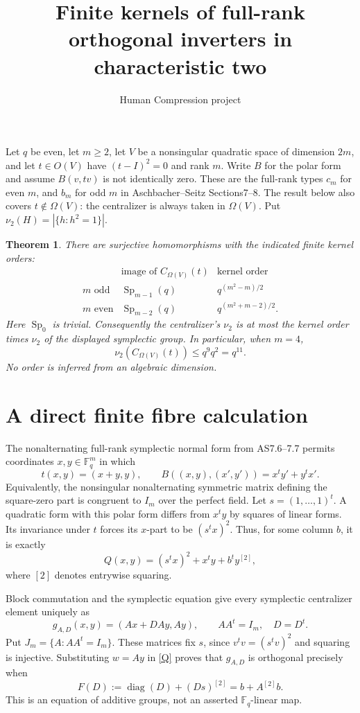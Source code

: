 \documentclass[11pt]{article}
\title{Finite kernels of full-rank orthogonal inverters in characteristic two}
\author{Human Compression project}\date{}
\newtheorem{theorem}{Theorem}\newtheorem{lemma}[theorem]{Lemma}
\newcommand{\F}{\mathbb F}\newcommand{\Sp}{\operatorname{Sp}}\newcommand{\diag}{\operatorname{diag}}\newcommand{\Tr}{\operatorname{Tr}}\newcommand{\Om}{\Omega}
\begin{document}
\maketitle
Let $q$ be even, let $m\ge2$, let $V$ be a nonsingular quadratic space
of dimension $2m$, and let $t\in O(V)$ have $(t-I)^2=0$ and rank $m$.
Write $B$ for the polar form and assume $B(v,tv)$ is not identically zero.
These are the full-rank types $c_m$ for even $m$, and $b_m$ for odd $m$
in Aschbacher--Seitz Sections7--8. The result below also covers $t\notin\Om(V)$:
the centralizer is always taken in $\Om(V)$. Put $\nu_2(H)=|\{h:h^2=1\}|$.

\begin{theorem}\label{main}
There are surjective homomorphisms with the indicated finite kernel orders:
\[
\begin{array}{c|c|c}
 &\text{image of }C_{\Om(V)}(t)&\text{kernel order}\\\hline
m\text{ odd}&\Sp_{m-1}(q)&q^{(m^2-m)/2}\\
m\text{ even}&\Sp_{m-2}(q)&q^{(m^2+m-2)/2}.
\end{array}
\]
Here $\Sp_0$ is trivial. Consequently the centralizer's $\nu_2$ is at most
the kernel order times $\nu_2$ of the displayed symplectic group.
In particular, when $m=4$,
\[
                  \nu_2(C_{\Om(V)}(t))\le q^9q^2=q^{11}.
\]
No order is inferred from an algebraic dimension.
\end{theorem}

\section{A direct finite fibre calculation}
The nonalternating full-rank symplectic normal form from AS7.6--7.7
permits coordinates $x,y\in\F_q^m$ in which
\[
 t(x,y)=(x+y,y),\qquad
 B((x,y),(x',y'))=x^ty'+y^tx'.
\]
Equivalently, the nonsingular nonalternating symmetric matrix defining
the square-zero part is congruent to $I_m$ over the perfect field.
Let $s=(1,\ldots,1)^t$. A quadratic form with this polar form differs
from $x^ty$ by squares of linear forms. Its invariance under $t$ forces
its $x$-part to be $(s^tx)^2$. Thus, for some column $b$, it is exactly
\begin{equation}\label{Q}
 Q(x,y)=(s^tx)^2+x^ty+b^ty^{[2]},
\end{equation}
where $[2]$ denotes entrywise squaring.

Block commutation and the symplectic equation give every symplectic
centralizer element uniquely as
\[
 g_{A,D}(x,y)=(Ax+DAy,Ay),\qquad AA^t=I_m,\quad D=D^t.
\]
Put $J_m=\{A:AA^t=I_m\}$. These matrices fix $s$, since
$v^tv=(s^tv)^2$ and squaring is injective. Substituting $w=Ay$ in
\eqref{Q} proves that $g_{A,D}$ is orthogonal precisely when
\begin{equation}\label{F}
 F(D):=\diag(D)+(Ds)^{[2]}=b+A^{[2]}b.
\end{equation}
This is an equation of additive groups, not an asserted $\F_q$-linear map.
\end{document}

